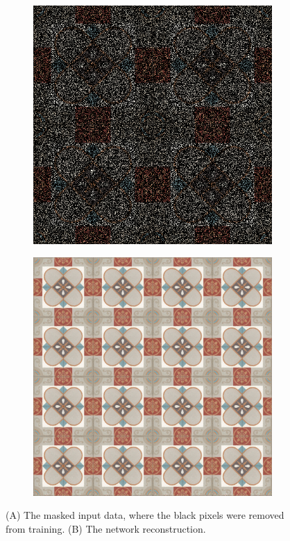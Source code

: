 \begin{figure}[!ht]
    \centering
      \begin{subfigure}{0.40\textwidth}
        \includegraphics[width=\linewidth]{img/ch6/stochastic_mask.png}
        \caption{}
      \end{subfigure}
      \begin{subfigure}{0.40\textwidth}
        \includegraphics[width=\linewidth]{img/ch6/extrapolation_randommask.png}
        \caption{}
      \end{subfigure}
      \caption{(A) The masked input data, where the black pixels were removed from training. (B) The network reconstruction.}
    \label{f:masked_recontruction}
\end{figure}


